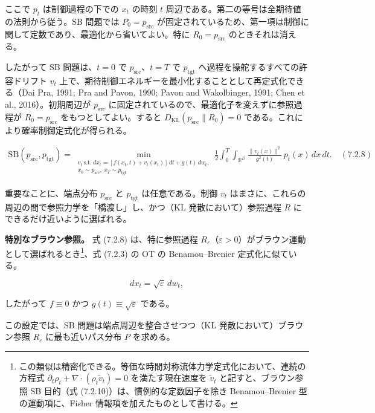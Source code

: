 

ここで $p_t$ は制御過程の下での $x_t$ の時刻 $t$ 周辺である。第二の等号は全期待値の法則から従う。SB 問題では $P_0=p_{\mathrm{src}}$ が固定されているため、第一項は制御に関して定数であり、最適化から省いてよい。特に $R_0=p_{\mathrm{src}}$ のときそれは消える。

したがって SB 問題は、$t=0$ で $p_{\mathrm{src}}$、$t=T$ で $p_{\mathrm{tgt}}$ へ過程を操舵するすべての許容ドリフト $v_t$ 上で、期待制御エネルギーを最小化することとして再定式化できる（Dai Pra, 1991; Pra and Pavon, 1990; Pavon and Wakolbinger, 1991; Chen et al., 2016）。初期周辺が $p_{\mathrm{src}}$ に固定されているので、最適化子を変えずに参照過程が $R_0=p_{\mathrm{src}}$ をもつとしてよい。すると $D_{\mathrm{KL}}(p_{\mathrm{src}}\|R_0)=0$ である。これにより確率制御定式化が得られる。

\begin{align*}
\mathrm{SB}(p_{\mathrm{src}},p_{\mathrm{tgt}})
=
\min_{\substack{v_t\ \mathrm{s.t.}\ dx_t=[f(x_t,t)+v_t(x_t)]\,dt+g(t)\,dw_t,\\ x_0\sim p_{\mathrm{src}},\ x_T\sim p_{\mathrm{tgt}}}}
\frac{1}{2}\int_0^T\int_{\mathbb{R}^D}\frac{\|v_t(x)\|^2}{g^2(t)}\,p_t(x)\,dx\,dt.
\quad (7.2.8)
\end{align*}


重要なことに、端点分布 $p_{\mathrm{src}}$ と $p_{\mathrm{tgt}}$ は任意である。制御 $v_t$ はまさに、これらの周辺の間で参照力学を「橋渡し」し、かつ（KL 発散において）参照過程 $R$ にできるだけ近いように選ばれる。

\textbf{特別なブラウン参照。} 式 (7.2.8) は、特に参照過程 $R_\varepsilon$（$\varepsilon>0$）がブラウン運動として選ばれるとき\footnote{この類似は精密化できる。等価な時間対称流体力学定式化において、連続の方程式 $\partial_t\rho_t+\nabla\cdot(\rho_t\tilde{v}_t)=0$ を満たす現在速度を $\tilde{v}_t$ と記すと、ブラウン参照 SB 目的（式 (7.2.10)）は、慣例的な定数因子を除き Benamou–Brenier 型の運動項に、Fisher 情報項を加えたものとして書ける。}、式 (7.2.3) の OT の Benamou–Brenier 定式化に似ている。

\[
dx_t=\sqrt{\varepsilon}\,dw_t,
\]


したがって $f\equiv 0$ かつ $g(t)\equiv\sqrt{\varepsilon}$ である。

この設定では、SB 問題は端点周辺を整合させつつ（KL 発散において）ブラウン参照 $R_\varepsilon$ に最も近いパス分布 $P$ を求める。


